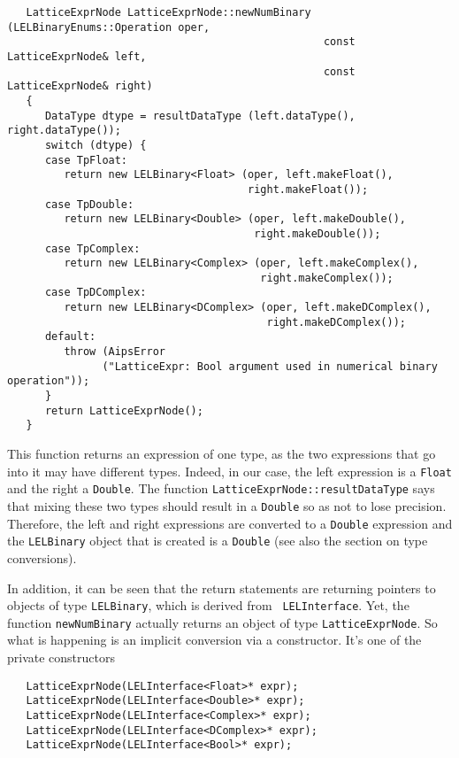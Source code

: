 \begin{verbatim}
   LatticeExprNode LatticeExprNode::newNumBinary (LELBinaryEnums::Operation oper,
                                                  const LatticeExprNode& left,
                                                  const LatticeExprNode& right)   
   {   
      DataType dtype = resultDataType (left.dataType(), right.dataType());
      switch (dtype) {
      case TpFloat:
         return new LELBinary<Float> (oper, left.makeFloat(),
                                      right.makeFloat());
      case TpDouble:
         return new LELBinary<Double> (oper, left.makeDouble(),
                                       right.makeDouble());
      case TpComplex:
         return new LELBinary<Complex> (oper, left.makeComplex(),
                                        right.makeComplex());
      case TpDComplex:
         return new LELBinary<DComplex> (oper, left.makeDComplex(),
                                         right.makeDComplex());
      default:
         throw (AipsError
               ("LatticeExpr: Bool argument used in numerical binary operation"));
      }
      return LatticeExprNode();
   }
\end{verbatim}


This function returns an expression of one type, as the two expressions
that go into it may have different types.  Indeed, in our case, the left
expression is a {\tt Float} and the right a {\tt Double}.  The function
{\tt LatticeExprNode::resultDataType} says that mixing these two types should
result in a {\tt Double} so as not to lose precision.  Therefore, the left
and right expressions are converted to a {\tt Double} expression and the
{\tt LELBinary} object that is created is a {\tt Double} (see also the
section on type conversions).

In addition, it can be seen that the return statements are returning
pointers to objects of type {\tt LELBinary}, which is derived from {\tt
LELInterface}.  Yet, the function {\tt newNumBinary} actually returns an
object of type {\tt LatticeExprNode}.  So what is happening is an
implicit conversion via a constructor.  It's one of the private
constructors

\begin{verbatim}
   LatticeExprNode(LELInterface<Float>* expr);
   LatticeExprNode(LELInterface<Double>* expr);
   LatticeExprNode(LELInterface<Complex>* expr);
   LatticeExprNode(LELInterface<DComplex>* expr);
   LatticeExprNode(LELInterface<Bool>* expr);
\end{verbatim}

